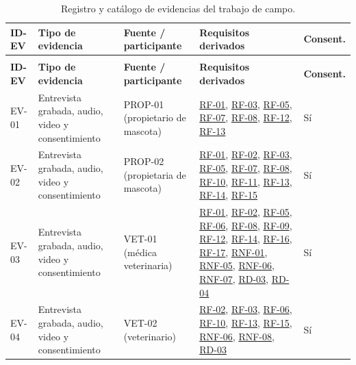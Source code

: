 \documentclass[journal,onecolumn]{IEEEtran}
\begin{document}
	{\small
		\begin{longtable}{@{}>{\raggedright\arraybackslash}p{1.2cm} >{\raggedright\arraybackslash}p{3.1cm} >{\raggedright\arraybackslash}p{3.1cm} >{\raggedright\arraybackslash}p{6.0cm} >{\raggedright\arraybackslash}p{1.4cm}@{}}
			\caption{Registro y catálogo de evidencias del trabajo de campo.}
			\label{tab:catalogo-evidencias}\\
			\toprule
			\textbf{ID-EV} & \textbf{Tipo de evidencia} & \textbf{Fuente / participante} & \textbf{Requisitos derivados} & \textbf{Consent.} \\
			\midrule
			\endfirsthead
			\multicolumn{5}{@{}l}{\small\itshape (continuación)}\\
			\toprule
			\textbf{ID-EV} & \textbf{Tipo de evidencia} & \textbf{Fuente / participante} & \textbf{Requisitos derivados} & \textbf{Consent.} \\
			\midrule
			\endhead
			\bottomrule
			\endlastfoot
			EV-01 & Entrevista grabada, audio, video y consentimiento & PROP-01 (propietario de mascota) & \hyperref[tab:RF-01]{RF-01}, \hyperref[tab:RF-03]{RF-03}, \hyperref[tab:RF-05]{RF-05}, \hyperref[tab:RF-07]{RF-07}, \hyperref[tab:RF-08]{RF-08}, \hyperref[tab:RF-12]{RF-12}, \hyperref[tab:RF-13]{RF-13} & Sí \\
			\addlinespace
			EV-02 & Entrevista grabada, audio, video y consentimiento & PROP-02 (propietaria de mascota) & \hyperref[tab:RF-01]{RF-01}, \hyperref[tab:RF-02]{RF-02}, \hyperref[tab:RF-03]{RF-03}, \hyperref[tab:RF-05]{RF-05}, \hyperref[tab:RF-07]{RF-07}, \hyperref[tab:RF-08]{RF-08}, \hyperref[tab:RF-10]{RF-10}, \hyperref[tab:RF-11]{RF-11}, \hyperref[tab:RF-13]{RF-13}, \hyperref[tab:RF-14]{RF-14}, \hyperref[tab:RF-15]{RF-15} & Sí \\
			\addlinespace
			EV-03 & Entrevista grabada, audio, video y consentimiento & VET-01 (médica veterinaria) & \hyperref[tab:RF-01]{RF-01}, \hyperref[tab:RF-02]{RF-02}, \hyperref[tab:RF-05]{RF-05}, \hyperref[tab:RF-06]{RF-06}, \hyperref[tab:RF-08]{RF-08}, \hyperref[tab:RF-09]{RF-09}, \hyperref[tab:RF-12]{RF-12}, \hyperref[tab:RF-14]{RF-14}, \hyperref[tab:RF-16]{RF-16}, \hyperref[tab:RF-17]{RF-17}, \hyperref[tab:RNF-01]{RNF-01}, \hyperref[tab:RNF-05]{RNF-05}, \hyperref[tab:RNF-06]{RNF-06}, \hyperref[tab:RNF-07]{RNF-07}, \hyperref[tab:RD-03]{RD-03}, \hyperref[tab:RD-04]{RD-04} & Sí \\
			\addlinespace
			EV-04 & Entrevista grabada, audio, video y consentimiento & VET-02 (veterinario) & \hyperref[tab:RF-02]{RF-02}, \hyperref[tab:RF-03]{RF-03}, \hyperref[tab:RF-06]{RF-06}, \hyperref[tab:RF-10]{RF-10}, \hyperref[tab:RF-13]{RF-13}, \hyperref[tab:RF-15]{RF-15}, \hyperref[tab:RNF-06]{RNF-06}, \hyperref[tab:RNF-08]{RNF-08}, \hyperref[tab:RD-03]{RD-03} & Sí \\

\end{longtable}}
\end{document}
